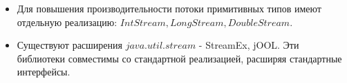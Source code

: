 \begin{frame}
\frametitle{\insertsection} 
\framesubtitle{\insertsubsection}
\begin{itemize}
	\item Для повышения производительности потоки примитивных типов имеют отдельную реализацию: $IntStream, LongStream, DoubleStream$.
	\item Существуют расширения $java.util.stream$ - StreamEx, jOOL. Эти библиотеки совместимы со стандартной реализацией, расширяя стандартные интерфейсы.
\end{itemize}
\end{frame}

